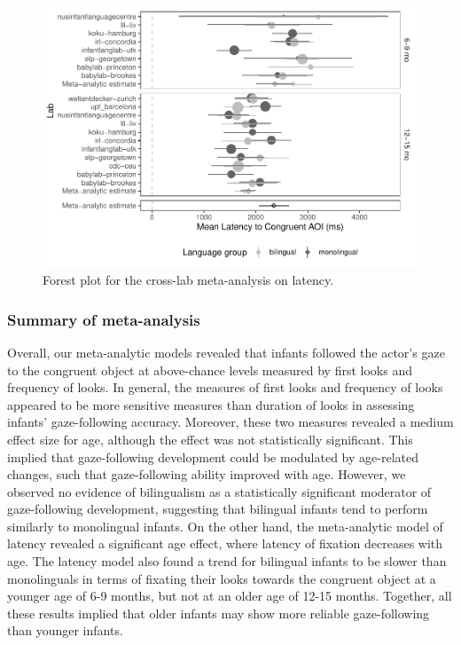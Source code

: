 \documentclass[,man,floatsintext]{apa6}
\begin{document}
\begin{figure}
\centering
\includegraphics{gaze-following-paper_files/figure-latex/fig5-1.pdf}
\caption{\label{fig:fig5}Forest plot for the cross-lab meta-analysis on latency.}
\end{figure}

\hypertarget{summary-of-meta-analysis}{%
\subsubsection{Summary of meta-analysis}\label{summary-of-meta-analysis}}

Overall, our meta-analytic models revealed that infants followed the actor's gaze to the congruent object at above-chance levels measured by first looks and frequency of looks. In general, the measures of first looks and frequency of looks appeared to be more sensitive measures than duration of looks in assessing infants' gaze-following accuracy. Moreover, these two measures revealed a medium effect size for age, although the effect was not statistically significant. This implied that gaze-following development could be modulated by age-related changes, such that gaze-following ability improved with age. However, we observed no evidence of bilingualism as a statistically significant moderator of gaze-following development, suggesting that bilingual infants tend to perform similarly to monolingual infants. On the other hand, the meta-analytic model of latency revealed a significant age effect, where latency of fixation decreases with age. The latency model also found a trend for bilingual infants to be slower than monolinguals in terms of fixating their looks towards the congruent object at a younger age of 6-9 months, but not at an older age of 12-15 months. Together, all these results implied that older infants may show more reliable gaze-following than younger infants.
\end{document}

